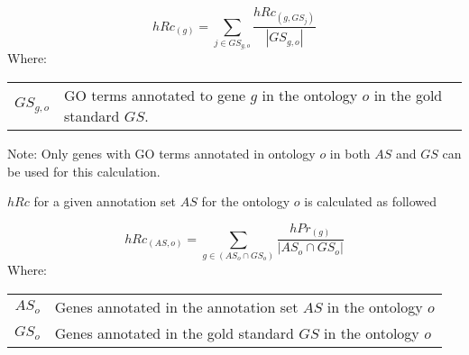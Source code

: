 \begin{equation}
    hRc_{(g)} =   \sum_{j \in GS_{g,o}}
    \frac{ hRc_{(g,GS_{j})}}
        {|GS_{g,o}|}
\end{equation}
Where:

\begin{tabularx}{0.95\textwidth}{r@{\ :\ }X}
    $GS_{g,o}$ & GO terms annotated to gene $g$ in the  ontology $o$ in the gold standard $GS$.
\end{tabularx}

Note: Only genes with GO terms annotated in ontology $o$ in both $AS$ and $GS$ can be used for this calculation.


$hRc$ for a given annotation set $AS$ for the ontology $o$ is calculated as followed

\begin{equation}
    hRc_{(AS,o)} =  \sum_{g \in (AS_{o} \cap GS_{o})}
    \frac{  hPr_{(g)}}
        {|AS_{o} \cap GS_{o}|}
\end{equation}
Where:

\begin{tabularx}{0.95\textwidth}{r@{\ :\ }X}
    $AS_{o}$ & Genes annotated in the annotation set $AS$ in the ontology $o$ \\
    $GS_{o}$ & Genes annotated in the gold standard $GS$ in the ontology $o$
\end{tabularx}


